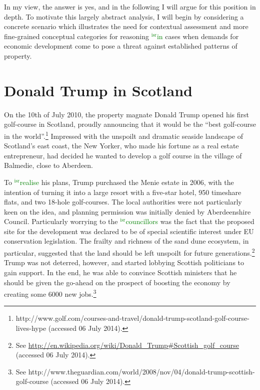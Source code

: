 \documentclass[12pt,a4paper]{book} %
\newcommand{\isr}[1]{\textcolor{green}{$^{\textrm{isr}}${#1}}}
\begin{document}
In my view, the answer is yes, and in the following I will argue for this position in depth. To motivate this largely abstract analysis, I will begin by considering a concrete scenario which illustrates the need for contextual assessment and more fine-grained conceptual categories for reasoning \isr{in} cases when demands for economic development come to pose a threat against established patterns of property.

\section{Donald Trump in Scotland}\label{sec:dts}

On the 10th of July 2010, the property magnate Donald Trump opened his first golf-course in Scotland, proudly announcing that it would be the ``best golf-course in the world''.\footnote{http://www.golf.com/courses-and-travel/donald-trump-scotland-golf-course-lives-hype (accessed 06 July 2014).} Impressed with the unspoilt and dramatic seaside landscape of Scotland's east coast, the New Yorker, who made his fortune as a real estate entrepreneur, had decided he wanted to develop a golf course in the village of Balmedie, close to Aberdeen.

To \isr{realise} his plans, Trump purchased the Menie estate in 2006, with the intention of turning it into a large resort with a five-star hotel, 950 timeshare flats, and two 18-hole golf-courses. The local authorities were not particularly keen on the idea, and planning permission was initially denied by Aberdeenshire Council. Particularly worrying to the \isr{councillors} was the fact that the proposed site for the development was declared to be of special scientific interest under EU conservation legislation. The frailty and richness of the sand dune ecosystem, in particular, suggested that the land should be left unspoilt for future generations.\footnote{See \url{http://en.wikipedia.org/wiki/Donald_Trump#Scottish_golf_course} (accessed 06 July 2014).} Trump was not deterred, however, and started lobbying Scottish politicians to gain support. In the end, he was able to convince Scottish ministers that he should be given the go-ahead on the prospect of boosting the economy by creating some 6000 new jobs.\footnote{See http://www.theguardian.com/world/2008/nov/04/donald-trump-scottish-golf-course (accessed 06 July 2014).}
\end{document}
